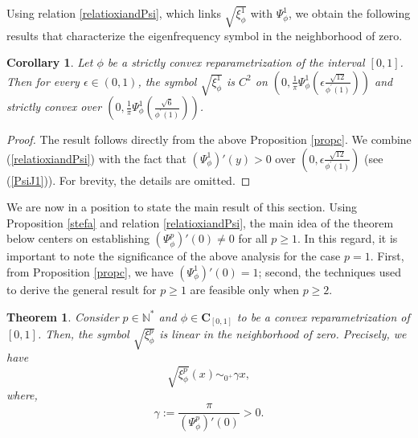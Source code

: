 \documentclass[11pt]{article}
\newtheorem{theorem}{Theorem}[section]
\newtheorem{corollary}{Corollary}[section]
\begin{document}

Using relation \eqref{relatioxiandPsi}, which links $\sqrt{\xi^1_{\phi}}$ with $\Psi^1_{\phi}$, we obtain the following results that characterize the eigenfrequency symbol in the neighborhood of zero.

\begin{corollary}
    Let $\phi$ be a strictly convex reparametrization of the interval $[0,1]$. Then for every $\epsilon\in(0,1)$, the symbol $\sqrt{\xi_{\phi}^1}$ is $C^2$ on $\left(0,\frac{1}{\pi}\Psi_{\phi}^1\left(\epsilon\frac{\sqrt{12}}{\phi^{'}(1)}  \right) \right)$ and strictly convex over $\left(0,\frac{1}{\pi}\Psi_{\phi}^1\left(\frac{\sqrt{6}}{\phi^{'}(1)}\right)\right)$.
\end{corollary}

\begin{proof}
    The result follows directly from the above Proposition \ref{propc}. We combine (\ref{relatioxiandPsi}) with the fact that $\left(\Psi_{\phi}^{1}\right)'(y)>0$ over $\left(0,\epsilon\frac{\sqrt{12}}{\phi^{'}(1)}  \right)$ (see (\ref{PsiJ1})). For brevity, the details are omitted.
\end{proof}

We are now in a position to state the main result of this section. Using Proposition \ref{stefa} and relation \eqref{relatioxiandPsi}, the main idea of the theorem below centers on establishing $\left(\Psi_{\phi}^{p}\right)'(0)\neq 0$ for all $p\geq 1$. In this regard, it is important to note the significance of the above analysis for the case $p=1$. First, from Proposition \ref{propc}, we have $\left(\Psi_{\phi}^{1}\right)'(0)=1$; second, the techniques used to derive the general result for $p\geq1$ are feasible only when $p\geq2$. 

\begin{theorem}\label{symbolnear0}
    Consider $p\in \mathbb{N}^{*}$ and $\phi\in \mathbf{C}_{[0,1]}$ to be a convex reparametrization  of $[0,1]$. Then, the symbol $\sqrt{\xi_{\phi}^p}$ is linear in the neighborhood of zero. Precisely, we have 
    \begin{equation}\label{assymptoticatzero}
        \sqrt{\xi_{\phi}^p}(x)\sim_{0^+} \gamma x,
    \end{equation}
where, 
\begin{equation}\label{gammadif}
    \gamma:= \frac{\pi}{\left(\Psi_{\phi}^{p}\right)'(0)}>0.
\end{equation}
\end{theorem}
\end{document}
